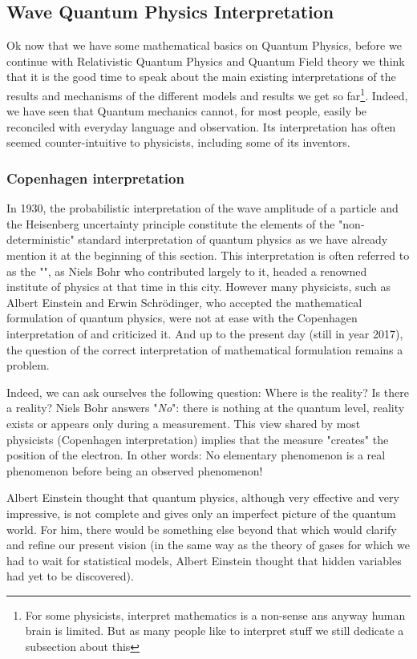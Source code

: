 	\pagebreak
	\subsection{Wave Quantum Physics Interpretation}
	Ok now that we have some mathematical basics on Quantum Physics, before we continue with Relativistic Quantum Physics and Quantum Field theory we think that it is the good time to speak about the main existing interpretations of the results and mechanisms of the different models and results we get so far\footnote{For some physicists, interpret mathematics is a non-sense ans anyway human brain is limited. But as many people like to interpret stuff we still dedicate a subsection about this}. Indeed, we have seen that Quantum mechanics cannot, for most people, easily be reconciled with everyday language and observation. Its interpretation has often seemed counter-intuitive to physicists, including some of its inventors.
	
	\subsubsection{Copenhagen interpretation}
	In 1930, the probabilistic interpretation of the wave amplitude of a particle and the Heisenberg uncertainty principle constitute the elements of the "non-deterministic" standard interpretation of quantum physics as we have already mention it at the beginning of this section. This interpretation is often referred to as the "", as Niels Bohr who contributed largely to it, headed a renowned institute of physics at that time in this city. However many physicists, such as Albert Einstein and Erwin Schrödinger, who accepted the mathematical formulation of quantum physics, were not at ease with the Copenhagen interpretation of and criticized it. And up to the present day (still in year 2017), the question of the correct interpretation of mathematical formulation remains a problem.
	
	Indeed, we can ask ourselves the following question: Where is the reality? Is there a reality? Niels Bohr answers "\textit{No}": there is nothing at the quantum level, reality exists or appears only during a measurement. This view shared by most physicists (Copenhagen interpretation) implies that the measure "creates" the position of the electron. In other words: No elementary phenomenon is a real phenomenon before being an observed phenomenon!
	
	Albert Einstein thought that quantum physics, although very effective and very impressive, is not complete and gives only an imperfect picture of the quantum world. For him, there would be something else beyond that which would clarify and refine our present vision (in the same way as the theory of gases for which we had to wait for statistical models, Albert Einstein thought that hidden variables had yet to be discovered).
	
